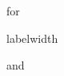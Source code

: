 \documentclass[no-math]{course}
\begin{document}
	\begin{Exercise}
	\begin{exercises}
		\item for
		\item labelwidth
		\item and
	\end{exercises}
\end{Exercise}
\end{document}
